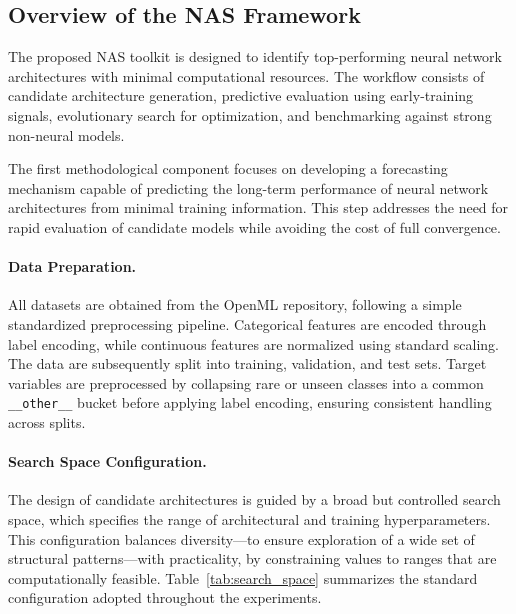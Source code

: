 \subsection{Overview of the NAS Framework}
The proposed NAS toolkit is designed to identify top-performing neural network architectures with minimal computational resources. The workflow consists of candidate architecture generation, predictive evaluation using early-training signals, evolutionary search for optimization, and benchmarking against strong non-neural models.


The first methodological component focuses on developing a forecasting mechanism capable of predicting the long-term performance of neural network architectures from minimal training information. This step addresses the need for rapid evaluation of candidate models while avoiding the cost of full convergence.

\paragraph{Data Preparation.}
All datasets are obtained from the OpenML repository, following a simple standardized preprocessing pipeline. Categorical features are encoded through label encoding, while continuous features are normalized using standard scaling. The data are subsequently split into training, validation, and test sets. Target variables are preprocessed by collapsing rare or unseen classes into a common \texttt{\_\_other\_\_} bucket before applying label encoding, ensuring consistent handling across splits.

\paragraph{Search Space Configuration.}
The design of candidate architectures is guided by a broad but controlled search space, which specifies the range of architectural and training hyperparameters. This configuration balances diversity---to ensure exploration of a wide set of structural patterns---with practicality, by constraining values to ranges that are computationally feasible. Table~\ref{tab:search_space} summarizes the standard configuration adopted throughout the experiments.


